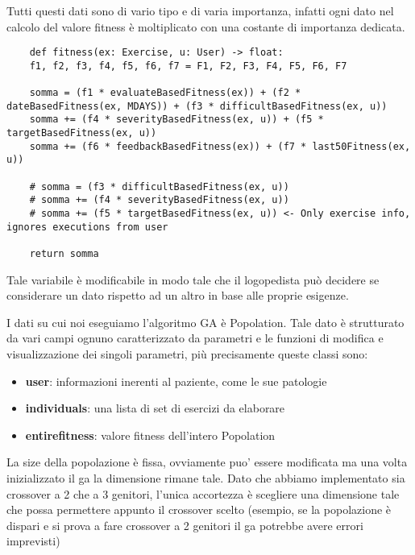 \documentclass{article}
\begin{document}
\pagebreak

Tutti questi dati sono di vario tipo e di varia importanza, infatti ogni dato nel calcolo del valore fitness è moltiplicato con una costante di importanza dedicata.
\begin{lstlisting}
    def fitness(ex: Exercise, u: User) -> float:
    f1, f2, f3, f4, f5, f6, f7 = F1, F2, F3, F4, F5, F6, F7

    somma = (f1 * evaluateBasedFitness(ex)) + (f2 * dateBasedFitness(ex, MDAYS)) + (f3 * difficultBasedFitness(ex, u))
    somma += (f4 * severityBasedFitness(ex, u)) + (f5 * targetBasedFitness(ex, u))
    somma += (f6 * feedbackBasedFitness(ex)) + (f7 * last50Fitness(ex, u))

    # somma = (f3 * difficultBasedFitness(ex, u))
    # somma += (f4 * severityBasedFitness(ex, u))
    # somma += (f5 * targetBasedFitness(ex, u)) <- Only exercise info, ignores executions from user

    return somma
\end{lstlisting}

Tale variabile è modificabile in modo tale che il logopedista può decidere se considerare un dato rispetto ad un altro in base alle proprie esigenze.

\pagebreak

I dati su cui noi eseguiamo l'algoritmo GA è Popolation. Tale dato è strutturato da vari campi ognuno caratterizzato da parametri e le funzioni di modifica e visualizzazione dei singoli parametri, più precisamente queste classi sono:

\begin{itemize}

\item\textbf{user}: informazioni inerenti al paziente, come le sue patologie

\item\textbf{individuals}: una lista di set di esercizi da elaborare

\item\textbf{entirefitness}: valore fitness dell'intero Popolation

\end{itemize}

\bigskip
La size della popolazione è fissa, ovviamente puo' essere modificata ma una volta inizializzato il ga la dimensione rimane tale.
Dato che abbiamo implementato sia crossover a 2 che a 3 genitori, l'unica accortezza è scegliere una dimensione tale che possa permettere appunto il crossover scelto (esempio, se la popolazione è dispari e si prova a fare crossover a 2 genitori il ga potrebbe avere errori imprevisti)
\bigskip
\end{document}
